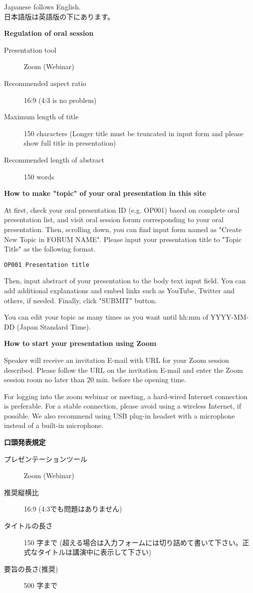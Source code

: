\documentclass[titlepage,10pt,a4paper,uplatex]{jsbook}
\newenvironment{content}{\begin{shaded}\vspace{-1em}\raggedright\ttfamily\footnotesize\setlength{\baselineskip}{1.4em}}{\end{shaded}\vspace{-1em}}
\renewcommand{\textbf}[1]{{\bfseries\sffamily#1}}
\begin{document}
\begin{content}
Japanese follows English.\\
日本語版は英語版の下にあります。

\textbf{\Large Regulation of oral session}

\begin{description}
\item[Presentation tool] Zoom (Webinar)
\item[Recommended aspect ratio] 16:9 (4:3 is no problem)
\item[Maximum length of title] 150 characters (Longer title must be truncated in input form and please show full title in presentation)
\item[Recommended length of abstract] 150 words
\end{description}

\textbf{\Large How to make "topic" of your oral presentation in this site}

At first, check your oral presentation ID (e.g. OP001) based on complete oral presentation list, and visit oral session forum corresponding to your oral presentation. Then, scrolling down, you can find input form named as "Create New Topic in FORUM NAME". Please input your presentation title to "Topic Title" as the following format.

\texttt{OP001 Presentation title}

Then, input abstract of your presentation to the body text input field. You can add additional explanations and embed links such as YouTube, Twitter and others, if needed. Finally, click "SUBMIT" button.

You can edit your topic as many times as you want until hh:mm of YYYY-MM-DD (Japan Standard Time).

\textbf{\Large How to start your presentation using Zoom}

Speaker will receive an invitation E-mail with URL for your Zoom session described. Please follow the URL on the invitation E-mail and enter the Zoom session room no later than 20 min. before the opening time.

For logging into the zoom webinar or meeting, a hard-wired Internet connection is preferable. For a stable connection, please avoid using a wireless Internet, if possible. We also recommend using USB plug-in headset with a microphone instead of a built-in microphone.

\textbf{\Large 口頭発表規定}

\begin{description}
\item[プレゼンテーションツール] Zoom (Webinar)
\item[推奨縦横比] 16:9 (4:3でも問題はありません)
\item[タイトルの長さ] 150 字まで (超える場合は入力フォームには切り詰めて書いて下さい。正式なタイトルは講演中に表示して下さい)
\item[要旨の長さ(推奨)] 500 字まで
\end{description}


\end{content}
\end{document}

